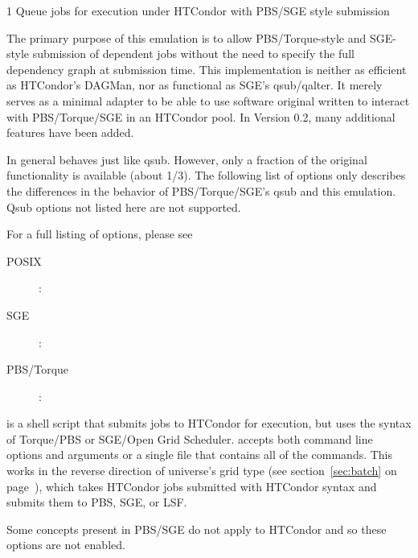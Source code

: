 \begin{ManPage}{\label{man-condor-qsub}}{1}
{Queue jobs for execution under HTCondor with PBS/SGE style submission}
\Synopsis {}


\Description

The primary purpose of this emulation is to allow PBS/Torque-style and 
SGE-style submission of dependent jobs without the need to specify the full
dependency graph at submission time. This implementation is neither as efficient
as HTCondor's DAGMan, nor as functional as SGE's qsub/qalter. It merely serves 
as a minimal adapter to be able to use software original written to interact 
with PBS/Torque/SGE in an HTCondor pool. In Version 0.2, many additional 
features have been added.

In general  behaves just like qsub. However, only a fraction of the
original functionality is available (about 1/3). The following list of options only
describes the differences in the behavior of PBS/Torque/SGE's qsub and this 
emulation. Qsub options not listed here are not supported.

For a full listing of options, please see
\begin{description}
\item[POSIX]: 
\item[SGE]: 
\item[PBS/Torque]: 
\end{description}

 is a shell script that submits jobs to HTCondor for execution, but 
uses the syntax of Torque/PBS or SGE/Open Grid Scheduler.  accepts
both command line options and arguments or a single file that contains all of the 
commands. This works in the reverse direction of  universe's 
 grid type (see section~\ref{sec:batch} on 
page~\pageref{sec:batch}), which takes HTCondor jobs submitted with HTCondor
syntax and submits them to PBS, SGE, or LSF.

Some concepts present in PBS/SGE do not apply to HTCondor and so these options are
not enabled.


\end{ManPage}
